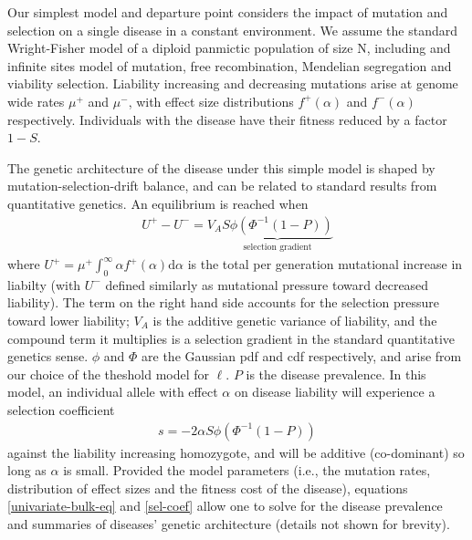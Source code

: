 \message{ !name(ResearchStrategy.tex)}\documentclass[11pt]{article}
\begin{document}
Our simplest model and departure point considers the impact of mutation and selection on a single disease in a constant environment. We assume the standard Wright-Fisher model of a diploid panmictic population of size N, including and infinite sites model of mutation, free recombination, Mendelian segregation and viability selection. Liability increasing and decreasing mutations arise at genome wide rates $\mu^+$ and $\mu^-$, with effect size distributions $f^+\left(\alpha\right)$ and $f^-\left(\alpha\right)$ respectively. Individuals with the disease have their fitness reduced by a factor $1-S$.

The genetic architecture of the disease under this simple model is shaped by mutation-selection-drift balance, and can be related to standard results from quantitative genetics. An equilibrium is reached when 
\begin{align}
  U^+ - U^- = V_A \underbrace{S\phi\left(\Phi^{-1}\left(1-P\right)\right)}_{\text{selection gradient}}
  \label{univariate-bulk-eq}
\end{align}
where $U^+ = \mu^+\int_{0}^{\infty}\alpha f^+\left(\alpha\right)\mathrm{d}\alpha$ is the total per generation mutational increase in liabilty (with $U^-$ defined similarly as mutational pressure toward decreased liability). The term on the right hand side accounts for the selection pressure toward lower liability; $V_A$ is the additive genetic variance of liability, and the compound term it multiplies is a selection gradient in the standard quantitative genetics sense.\cite{CharlesworthBook} $\phi$ and $\Phi$ are the Gaussian pdf and cdf respectively, and arise from our choice of the theshold model for $\ell$.  $P$ is the disease prevalence.  In this model, an individual allele with effect $\alpha$ on disease liability will experience a selection coefficient
\begin{align}
  s = -2\alpha S\phi\left(\Phi^{-1}\left(1-P\right)\right)
  \label{sel-coef}
\end{align}
against the liability increasing homozygote, and will be additive (co-dominant) so long as $\alpha$ is small.
Provided the model parameters  (i.e., the mutation rates, distribution of effect sizes and the fitness cost of the disease), equations \eqref{univariate-bulk-eq} and \eqref{sel-coef} allow one to solve for the disease prevalence and summaries of diseases' genetic architecture (details not shown for brevity).

\end{document}
